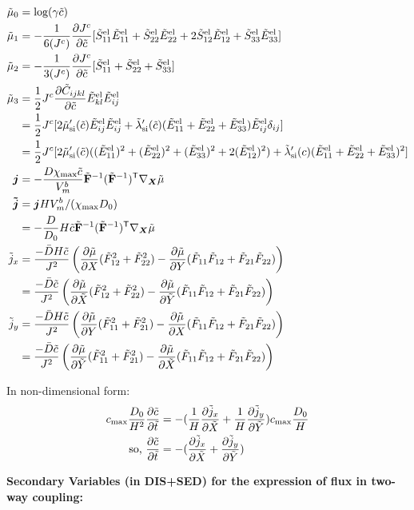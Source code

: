\documentclass[../main.tex]{subfiles}
\begin{document}
\begin{align}
    \td{\mu}_0 &= \text{log}(\gamma \td{c}) \\
    \td{\mu}_1 &= -\fc{1}{6(\jc)}\pdiff{\jc}{\tc} [\tSel{11}\tEel{11} + \tSel{22}\tEel{22} + 2\tSel{12}\tEel{12} + \tSel{33}\tEel{33}] \\
    \td{\mu}_2 &= -\fc{1}{3(\jc)}\pdiff{ \jc}{\tc}[\tSel{11} + \tSel{22} + \tSel{33}] \\
    \td{\mu}_3 &= \fc{1}{2}\jc \pdiff{ \td{C}_{ijkl}}{\tc}\tEel{kl}\tEel{ij} \\
    &=  \fc{1}{2}\jc [2\tmusi'(\td{c})\tEel{ij}\tEel{ij} + \tlamsi'(\tc)(\tEel{11} + \tEel{22} + \tEel{33}) \tEel{ij} \delta_{ij}] \\
    &= \fc{1}{2}\jc[2\tmusi'(\td{c})((\tEel{11})^2 + (\tEel{22})^2 + (\tEel{33})^2 + 2 (\tEel{12})^2) + \tlamsi'(c)(\tEel{11} + \tEel{22} + \tEel{33})^2]\\
    \bm{j} &= - \fc{D\xmax \tc}{V^b_m} \td{\F}^{-1} (\td{\F}^{-1})^\T \nabla_{\X} \td \mu \\
    \bm{\td j} &= \bm{j}H V_m^b/(\chi_{\text{max}}D_0)\\
                &= -\fc{D}{D_0}H \tc \td{\F}^{-1}(\td{\F}^{-1})^\T \nabla_{\X} \td \mu\\
    \td{j}_x &= \fc{-\bar{D} H \tc}{J^2} \left(\pdiff{ \td \mu}{X}(\tF{12}^2 + \tF{22}^2) - \pdiff{ \td \mu}{ Y}(\tF{11}\tF{12} + \tF{21}\tF{22})\right)\\
    &= \fc{-\bar{D}  \tc}{J^2} \left(\pdiff{ \td \mu}{\tX}(\tF{12}^2 + \tF{22}^2) - \pdiff{ \td \mu}{\tY}(\tF{11}\tF{12} + \tF{21}\tF{22})\right)\\
    \td{j}_y &= \fc{-\bar{D} H \tc}{J^2} \left(\pdiff{ \td \mu}{Y}(\tF{11}^2 + \tF{21}^2) - \pdiff{ \td \mu}{X}(\tF{11}\tF{12} + \tF{21}\tF{22})\right)\\
    &= \fc{-\bar{D}  \tc}{J^2} \left( \pdiff{ \td \mu}{\tY}(\tF{11}^2 + \tF{21}^2) -\pdiff{ \td \mu}{\tX}(\tF{11}\tF{12} + \tF{21}\tF{22})\right)\\
\end{align}

In non-dimensional form:
\begin{align}
    \cmax \fc{D_0}{H^2} \pdiff{{\td{c}}}{\tt}  &= -(\fc{1}{H}\pdiff{ \td{j}_x}{\tX} + \fc{1}{H}\pdiff{ \td{j}_y}{\tY})\cmax \fc{D_0}{H} \\
    \text{so, }  \pdiff{{\tc}}{\tt}  &= - (\pdiff{ \td{j}_x}{\tX} +  \pdiff{ \td{j}_y}{\tY})
\end{align}

\textbf{Secondary Variables (in DIS+SED) for the expression of flux in two-way coupling:}
\end{document}
